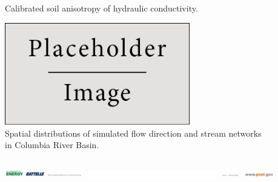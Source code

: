 \documentclass[final]{beamer}
\newlength{\sepwid}
\newlength{\threecolwid}
\begin{document}
\begin{frame}[t]
\begin{columns}[t]
\begin{column}{\threecolwid}
\begin{minipage}[b][0.3\textheight][c]{0.4\textwidth}
\begin{figure}
          \caption{Calibrated soil anisotropy of hydraulic conductivity.}
          \label{fig:clm_structure}
        \end{figure}
      \end{minipage}

      \begin{figure}
        \includegraphics[width = 0.72\textwidth]{figure/placeholder.jpg}
        \caption{Spatial distributions of simulated flow direction and stream networks in Columbia River Basin.}
        \label{fig:cbc}
      \end{figure}
    \end{column} %
  \end{columns} %
  \vspace{0in}
  \begin{columns}[t]
    \begin{column}{\sepwid}
    \end{column} %
    \begin{column}{\sepwid}
    \end{column} %
    \begin{column}{0.9\paperwidth}
      \includegraphics[width=\textwidth,center]{figure/bottom_logo.png}
    \end{column}
    \begin{column}{\sepwid}
    \end{column} %
  \end{columns}
\end{frame} %
\end{document}
